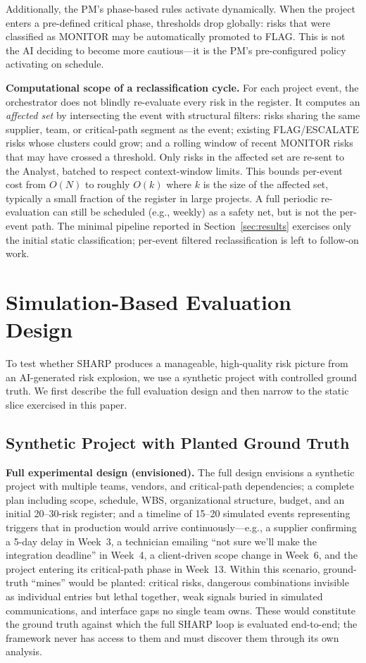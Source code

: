 \documentclass[runningheads]{llncs}
\begin{document}
Additionally, the PM's phase-based rules activate dynamically. When the project enters a pre-defined critical phase, thresholds drop globally: risks that were classified as MONITOR may be automatically promoted to FLAG. This is not the AI deciding to become more cautious---it is the PM's pre-configured policy activating on schedule.

\textbf{Computational scope of a reclassification cycle.} For each project event, the orchestrator does not blindly re-evaluate every risk in the register. It computes an \emph{affected set} by intersecting the event with structural filters: risks sharing the same supplier, team, or critical-path segment as the event; existing FLAG/ESCALATE risks whose clusters could grow; and a rolling window of recent MONITOR risks that may have crossed a threshold. Only risks in the affected set are re-sent to the Analyst, batched to respect context-window limits. This bounds per-event cost from \(O(N)\) to roughly \(O(k)\) where \(k\) is the size of the affected set, typically a small fraction of the register in large projects. A full periodic re-evaluation can still be scheduled (e.g., weekly) as a safety net, but is not the per-event path. The minimal pipeline reported in Section~\ref{sec:results} exercises only the initial static classification; per-event filtered reclassification is left to follow-on work.

\section{Simulation-Based Evaluation Design}

To test whether SHARP produces a manageable, high-quality risk picture from an AI-generated risk explosion, we use a synthetic project with controlled ground truth. We first describe the full evaluation design and then narrow to the static slice exercised in this paper.

\subsection{Synthetic Project with Planted Ground Truth}

\textbf{Full experimental design (envisioned).} The full design envisions a synthetic project with multiple teams, vendors, and critical-path dependencies; a complete plan including scope, schedule, WBS, organizational structure, budget, and an initial 20--30-risk register; and a timeline of 15--20 simulated events representing triggers that in production would arrive continuously---e.g., a supplier confirming a 5-day delay in Week~3, a technician emailing ``not sure we'll make the integration deadline'' in Week~4, a client-driven scope change in Week~6, and the project entering its critical-path phase in Week~13. Within this scenario, ground-truth ``mines'' would be planted: critical risks, dangerous combinations invisible as individual entries but lethal together, weak signals buried in simulated communications, and interface gaps no single team owns. These would constitute the ground truth against which the full SHARP loop is evaluated end-to-end; the framework never has access to them and must discover them through its own analysis.
\end{document}
